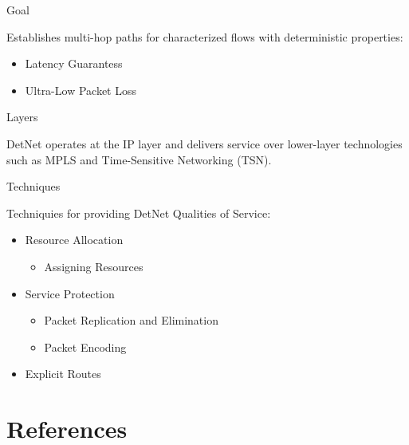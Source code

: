 \documentclass{beamer}
\begin{document}
\begin{frame}{}
  \begin{block}{Goal}
    \par
    Establishes multi-hop paths for characterized flows with deterministic properties:
    \begin{itemize}
      \item Latency Guarantess
      \item Ultra-Low Packet Loss
    \end{itemize}
  \end{block}

  \begin{block}{Layers}
    \par
    DetNet operates at the IP layer and delivers service over lower-layer technologies such as MPLS and Time-Sensitive Networking (TSN).
  \end{block}
\end{frame}

\begin{frame}{Techniques}
  \par
  Techniquies for providing DetNet Qualities of Service:~\cite{Finn2019}
  \begin{itemize}
    \item Resource Allocation
      \begin{itemize}
        \item Assigning Resources
      \end{itemize}
    \item Service Protection
      \begin{itemize}
        \item Packet Replication and Elimination
        \item Packet Encoding
      \end{itemize}
    \item Explicit Routes
  \end{itemize}
\end{frame}

\section{References}

\begin{frame}{}
  \printbibliography%
\end{frame}
\end{document}
